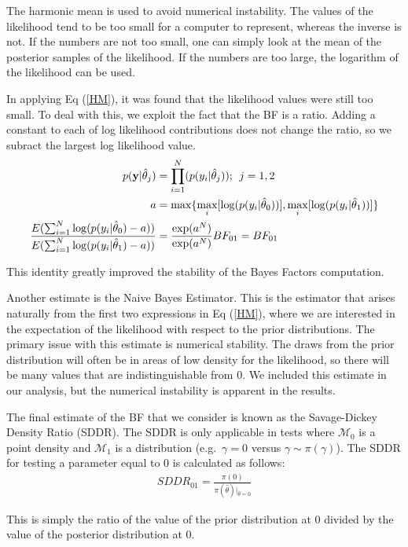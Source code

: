 \documentclass[10pt,letterpaper]{article}
\begin{document}
The harmonic mean is used to avoid numerical instability. The values of
the likelihood tend to be too small for a computer to represent, whereas
the inverse is not. If the numbers are not too small, one can simply
look at the mean of the posterior samples of the likelihood. If the numbers are too large, the logarithm of the likelihood can be used.

In applying Eq (\ref{HM}), it was found that the likelihood values
were still too small. To deal with this, we exploit the fact that the BF
is a ratio. Adding a constant to each of log likelihood contributions
does not change the ratio, so we subract the largest log likelihood
value.
\begin{align}
p(\mathbf y |\hat\theta_j) &= \prod_{i = 1}^N(p(y_i|\hat\theta_j))\text{;\; }j = 1,2\\
a &= \max\{\max_i[\log(p(y_i | \hat\theta_0))], \max_i[\log(p( y_i | \hat\theta_1))]\}\\
\frac{E(\sum_{i=1}^N\log(p(y_i|\hat\theta_0) - a))}{E(\sum_{i=1}^N\log(p(y_i|\hat\theta_1) - a))} &=\frac{\exp(a^N)}{\exp(a^N)} BF_{01} = BF_{01}
\end{align}

This identity greatly improved the stability of the Bayes Factors
computation.

Another estimate is the Naive Bayes Estimator. This is the estimator
that arises naturally from the first two expressions in Eq (\ref{HM}), where we are interested
in the expectation of the likelihood with respect to the prior
distributions. The primary issue with this estimate is numerical
stability. The draws from the prior distribution will often be in areas
of low density for the likelihood, so there will be many values that are
indistinguishable from 0. We included this estimate in our analysis, but
the numerical instability is apparent in the results.

The final estimate of the BF that we consider is known as the
Savage-Dickey Density Ratio (SDDR). The SDDR is only applicable in tests
where \(\mathcal M_0\) is a point density and \(\mathcal M_1\) is a
distribution (e.g.~\(\gamma = 0\) versus \(\gamma \sim \pi(\gamma)\)).
The SDDR for testing a parameter equal to 0 is calculated as follows:
\begin{align}
SDDR_{01} = \frac{\pi(0)}{\pi(\hat\theta)|_{\hat\theta = 0}}
\end{align}

This is simply the ratio of the value of the prior distribution at 0
divided by the value of the posterior distribution at 0.
\end{document}
